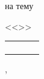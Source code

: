\begin{center}
\begin{center}


{\smaller[1]
на тему

<<\Title>>}
\end{center}

\vfill

\large

\begin{tabular}{p{}P{0.25\textwidth}P{0.01\textwidth}P{0.25\textwidth}} 
 \\[10pt]
 \\[10pt]
\end{tabular}

\vfill

\City, \Year

\end{center}




